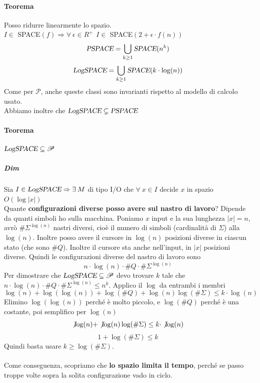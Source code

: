 \documentclass[10pt]{book}
\begin{document}
\paragraph{Teorema} Posso ridurre linearmente lo spazio.\\
$I \in$ SPACE$(f) \Rightarrow \forall\:\epsilon\in R^+\:\: I \in$ SPACE$(2 + \epsilon\cdot f(n))$
$$\textsl{PSPACE} = \bigcup_{k\geq 1} \textsl{SPACE}(n^k)$$
$$\textsl{LogSPACE} = \bigcup_{k\geq 1} \textsl{SPACE}(k\cdot\log(n))$$
Come per $\mathscr{P}$, anche queste classi sono invarianti rispetto al modello di calcolo usato.\\
Abbiamo inoltre che $\textsl{LogSPACE}\subsetneq\textsl{PSPACE}$
\pagebreak
\paragraph{Teorema} $\textsl{LogSPACE} \subseteq \mathscr{P}$
\subparagraph{Dim} Sia $I \in \textsl{LogSPACE} \Rightarrow \exists\: M$ di tipo I/O che $\forall\:x\in I$ decide $x$ in spazio $O(\log|x|)$\\
Quante \textbf{configurazioni diverse posso avere sul nastro di lavoro}? Dipende da quanti simboli ho sulla macchina. Poniamo $x$ input e la sua lunghezza $|x| = n$, avrò $\#\Sigma^{\log(n)}$ nastri diversi, cioè il numero di simboli (cardinalità di $\Sigma$) alla $\log (n)$. Inoltre posso avere il cursore in $\log(n)$ posizioni diverse in ciascun stato (che sono $\# Q$). Inoltre il cursore sta anche nell'input, in $|x|$ posizioni diverse. Quindi le configurazioni diverse del nastro di lavoro sono 
$$n\cdot\log(n)\cdot\# Q\cdot\#\Sigma^{\log(n)}$$
Per dimostrare che $\textsl{LogSPACE} \subseteq \mathscr{P}$ devo trovare $k$ tale che $n\cdot\log(n)\cdot\# Q\cdot\#\Sigma^{\log(n)} \leq n^k$. Applico il $\log$ da entrambi i membri
$$\log(n) + \log(\log(n)) + \log(\# Q) + \log(n)\log(\#\Sigma) \leq k\cdot\log(n)$$
Elimino $\log(\log(n))$ perché è molto piccolo, e $\log(\# Q)$ perché è una costante, poi semplifico per $\log(n)$
$$\not\log(n) + \not\log(n)\log(\#\Sigma) \leq k\cdot\not\log(n)$$
$$1 + \log(\#\Sigma) \leq k$$
Quindi basta usare $k \geq \log(\#\Sigma)$.\\\\
Come conseguenza, scopriamo che \textbf{lo spazio limita il tempo}, perché se passo troppe volte sopra la solita configurazione vado in ciclo.
\end{document}
